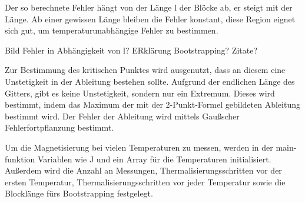 	
	Der so berechnete Fehler hängt von der Länge l der Blöcke ab, er steigt mit der Länge. Ab einer gewissen Länge bleiben die Fehler konstant, diese Region eignet sich gut, um temperaturunabhängige Fehler zu bestimmen.
	
	Bild Fehler in Abhängigkeit von l? ERklärung Bootstrapping? Zitate?
	
	Zur Bestimmung des kritischen Punktes wird ausgenutzt, dass an diesem eine Unstetigkeit in der Ableitung bestehen sollte. Aufgrund der endlichen Länge des Gitters, gibt es keine Unstetigkeit, sondern nur ein Extremum. Dieses wird bestimmt, indem das Maximum der mit der 2-Punkt-Formel gebildeten Ableitung bestimmt wird. Der Fehler der Ableitung wird mittels Gaußscher Fehlerfortpflanzung bestimmt.
		
	Um die Magnetisierung bei vielen Temperaturen zu messen, werden in der main-funktion Variablen wie J und ein Array für die Temperaturen initialisiert. Außerdem wird die Anzahl an Messungen, Thermalisierungsschritten vor der ersten Temperatur, Thermalisierungsschritten vor jeder Temperatur sowie die Blocklänge fürs Bootstrapping festgelegt. 	
	
